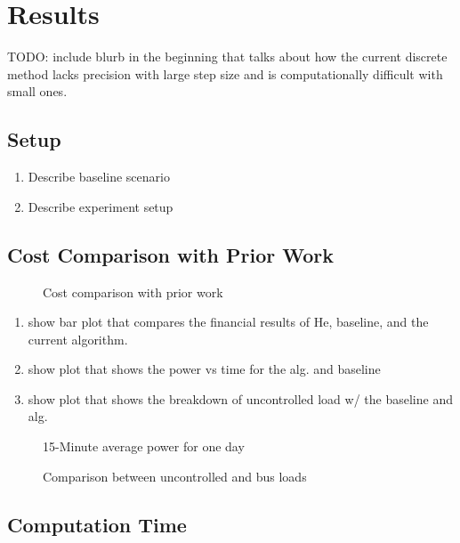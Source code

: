 \section{Results\label{sec:results}}
TODO: include blurb in the beginning that talks about how the current discrete method lacks precision with large step size and is computationally difficult with small ones.
\subsection{Setup}
\begin{enumerate}
	\item Describe baseline scenario
	\item Describe experiment setup
\end{enumerate}

\subsection{Cost Comparison with Prior Work} 
\begin{figure}
	\centering
	\caption{Cost comparison with prior work}
	\label{fig:costComparison}
\end{figure}

\begin{enumerate}
	\item show bar plot that compares the financial results of He, baseline, and the current algorithm.
	\item show plot that shows the power vs time for the alg. and baseline
	\item show plot that shows the breakdown of uncontrolled load w/ the baseline and alg.
\end{enumerate} 

\begin{figure*}
	\centering
	\caption{15-Minute average power for one day}
	\label{fig:totalPower}
\end{figure*}
\begin{figure*}
	\centering
	\caption{Comparison between uncontrolled and bus loads}
	\label{fig:powerPlot}
\end{figure*}

\subsection{Computation Time} 









